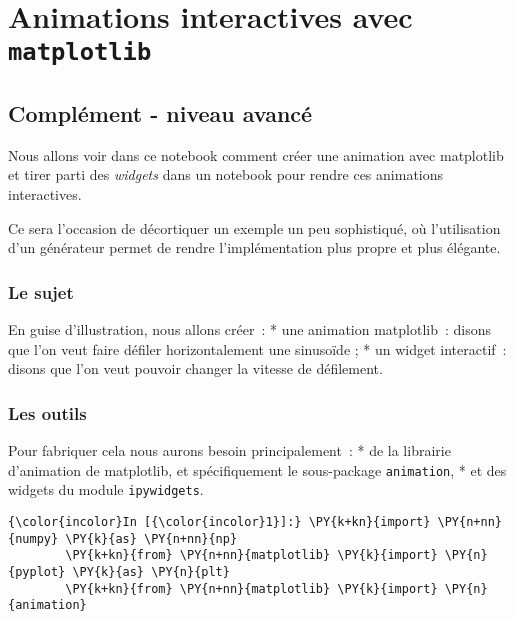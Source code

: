     
    
    
    

    

    \hypertarget{animations-interactives-avec-matplotlib}{%
\section{\texorpdfstring{Animations interactives avec
\texttt{matplotlib}}{Animations interactives avec matplotlib}}\label{animations-interactives-avec-matplotlib}}

    \hypertarget{compluxe9ment---niveau-avancuxe9}{%
\subsection{Complément - niveau
avancé}\label{compluxe9ment---niveau-avancuxe9}}

    Nous allons voir dans ce notebook comment créer une animation avec
matplotlib et tirer parti des \emph{widgets} dans un notebook pour
rendre ces animations interactives.

Ce sera l'occasion de décortiquer un exemple un peu sophistiqué, où
l'utilisation d'un générateur permet de rendre l'implémentation plus
propre et plus élégante.

    \hypertarget{le-sujet}{%
\subsubsection{Le sujet}\label{le-sujet}}

    En guise d'illustration, nous allons créer~: * une animation
matplotlib~: disons que l'on veut faire défiler horizontalement une
sinusoïde ; * un widget interactif~: disons que l'on veut pouvoir
changer la vitesse de défilement.

    \hypertarget{les-outils}{%
\subsubsection{Les outils}\label{les-outils}}

    Pour fabriquer cela nous aurons besoin principalement~: * de la
librairie d'animation de matplotlib, et spécifiquement le sous-package
\texttt{animation}, * et des widgets du module \texttt{ipywidgets}.

    \begin{Verbatim}[commandchars=\\\{\}]
{\color{incolor}In [{\color{incolor}1}]:} \PY{k+kn}{import} \PY{n+nn}{numpy} \PY{k}{as} \PY{n+nn}{np}
        \PY{k+kn}{from} \PY{n+nn}{matplotlib} \PY{k}{import} \PY{n}{pyplot} \PY{k}{as} \PY{n}{plt}
        \PY{k+kn}{from} \PY{n+nn}{matplotlib} \PY{k}{import} \PY{n}{animation}
\end{Verbatim}


